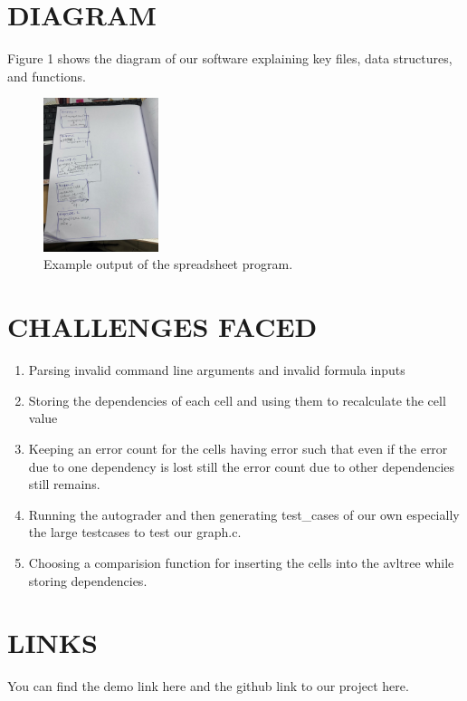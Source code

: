 \documentclass[a4paper]{article}
\begin{document}
\begin{enumerate}
    
    
\end{enumerate}

\section{DIAGRAM}
    Figure 1 shows the diagram of our software explaining key files, data structures, and functions.
\begin{figure}
\centering
\includegraphics[width=0.3\textwidth]{copass.jpg}
\caption{Example output of the spreadsheet program.}
\end{figure}


\section{CHALLENGES FACED}
\begin{enumerate}
    \item Parsing invalid command line arguments and invalid formula inputs
    \item Storing the dependencies of each cell and using them to recalculate the cell value
    \item Keeping an error count for the cells having error such that even if the error due to one dependency is lost still the error count due to other dependencies still remains.
    \item Running the autograder and then generating test\_cases of our own especially the large testcases to test our graph.c.
    \item Choosing a comparision function for inserting the cells into the avltree while storing dependencies.
\end{enumerate}

\section{LINKS}
You can find the demo link here and the github link to our project here.
\end{document}

